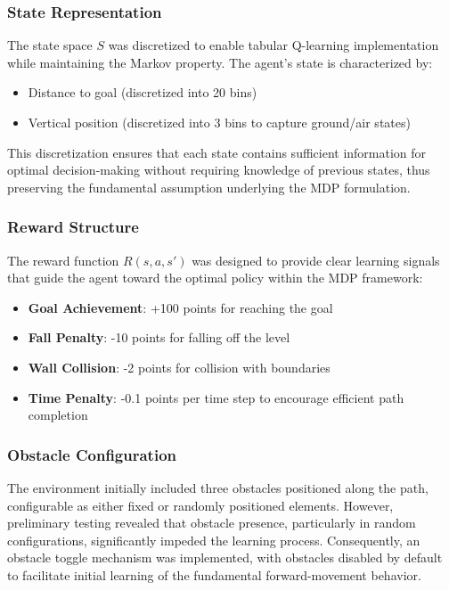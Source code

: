 \subsubsection{State Representation}
The state space $S$ was discretized to enable tabular Q-learning implementation while maintaining the Markov property. The agent's state is characterized by:
\begin{itemize}
    \item Distance to goal (discretized into 20 bins)
    \item Vertical position (discretized into 3 bins to capture ground/air states)
\end{itemize}

This discretization ensures that each state contains sufficient information for optimal decision-making without requiring knowledge of previous states, thus preserving the fundamental assumption underlying the MDP formulation.

\subsubsection{Reward Structure}
The reward function $R(s,a,s')$ was designed to provide clear learning signals that guide the agent toward the optimal policy within the MDP framework:
\begin{itemize}
    \item \textbf{Goal Achievement}: +100 points for reaching the goal
    \item \textbf{Fall Penalty}: -10 points for falling off the level
    \item \textbf{Wall Collision}: -2 points for collision with boundaries
    \item \textbf{Time Penalty}: -0.1 points per time step to encourage efficient path completion
\end{itemize}

\subsubsection{Obstacle Configuration}
The environment initially included three obstacles positioned along the path, configurable as either fixed or randomly positioned elements. However, preliminary testing revealed that obstacle presence, particularly in random configurations, significantly impeded the learning process. Consequently, an obstacle toggle mechanism was implemented, with obstacles disabled by default to facilitate initial learning of the fundamental forward-movement behavior.

